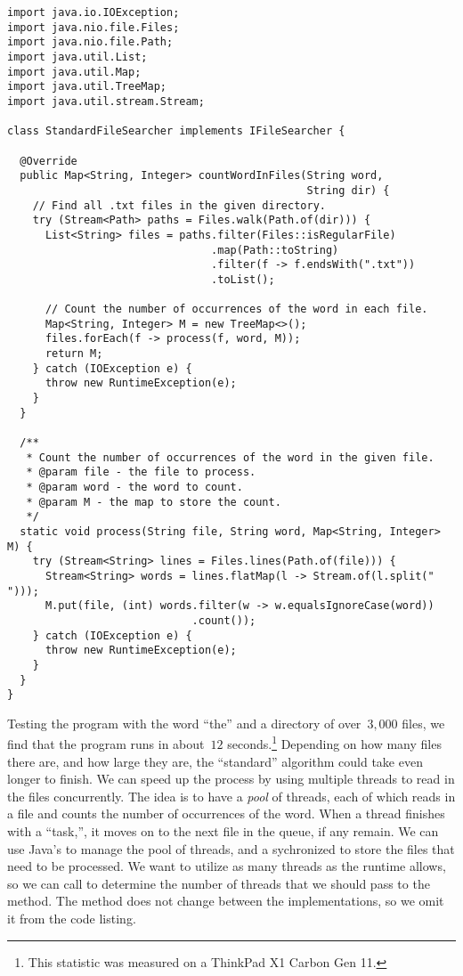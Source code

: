 \begin{lstlisting}[language=MyJava]
import java.io.IOException;
import java.nio.file.Files;
import java.nio.file.Path;
import java.util.List;
import java.util.Map;
import java.util.TreeMap;
import java.util.stream.Stream;

class StandardFileSearcher implements IFileSearcher {

  @Override
  public Map<String, Integer> countWordInFiles(String word,
                                               String dir) {
    // Find all .txt files in the given directory.
    try (Stream<Path> paths = Files.walk(Path.of(dir))) {
      List<String> files = paths.filter(Files::isRegularFile)
                                .map(Path::toString)
                                .filter(f -> f.endsWith(".txt"))
                                .toList();

      // Count the number of occurrences of the word in each file.
      Map<String, Integer> M = new TreeMap<>();
      files.forEach(f -> process(f, word, M));
      return M;
    } catch (IOException e) {
      throw new RuntimeException(e);
    }
  }

  /**
   * Count the number of occurrences of the word in the given file.
   * @param file - the file to process.
   * @param word - the word to count.
   * @param M - the map to store the count.
   */
  static void process(String file, String word, Map<String, Integer> M) {
    try (Stream<String> lines = Files.lines(Path.of(file))) {
      Stream<String> words = lines.flatMap(l -> Stream.of(l.split(" ")));
      M.put(file, (int) words.filter(w -> w.equalsIgnoreCase(word))
                             .count());
    } catch (IOException e) {
      throw new RuntimeException(e);
    }
  }
}
\end{lstlisting}

Testing the program with the word ``the'' and a directory of over~$3,000$  files, we find that the program runs in about~$12$ seconds.\footnote{This statistic was measured on a ThinkPad X1 Carbon Gen 11.}
Depending on how many files there are, and how large they are, the ``standard'' algorithm could take even longer to finish.
We can speed up the process by using multiple threads to read in the files concurrently.
The idea is to have a \emph{pool} of threads, each of which reads in a file and counts the number of occurrences of the word.
When a thread finishes with a ``task,'', it moves on to the next file in the queue, if any remain.
We can use Java's  to manage the pool of threads, and a sychronized  to store the files that need to be processed.
We want to utilize as many threads as the runtime allows, so we can call  to determine the number of threads that we should pass to the  method.
The  method does not change between the implementations, so we omit it from the code listing.

